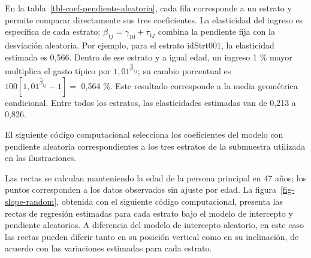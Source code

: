 \documentclass[
  spanish,
  11pt,
  letterpaper,
  oneside,
  open=any]{scrbook}
\newenvironment{Shaded}{\begin{snugshade}}{\end{snugshade}}
\newcommand{\AttributeTok}[1]{\textcolor[rgb]{0.40,0.45,0.13}{#1}}
\newcommand{\FunctionTok}[1]{\textcolor[rgb]{0.28,0.35,0.67}{#1}}
\newcommand{\NormalTok}[1]{\textcolor[rgb]{0.00,0.23,0.31}{#1}}
\newcommand{\OtherTok}[1]{\textcolor[rgb]{0.00,0.23,0.31}{#1}}
\newcommand{\SpecialCharTok}[1]{\textcolor[rgb]{0.37,0.37,0.37}{#1}}
\newcommand{\StringTok}[1]{\textcolor[rgb]{0.13,0.47,0.30}{#1}}
\begin{document}
En la tabla~\ref{tbl-coef-pendiente-aleatoria}, cada fila corresponde a
un estrato y permite comparar directamente sus tres coeficientes. La
elasticidad del ingreso es específica de cada estrato:
\(\beta_{1j}=\gamma_{10}+\tau_{1j}\) combina la pendiente fija con la
desviación aleatoria. Por ejemplo, para el estrato idStrt001, la
elasticidad estimada es 0,566. Dentro de ese estrato y a igual edad, un
ingreso 1 \% mayor multiplica el gasto típico por
\(1{,}01^{\hat\beta_{1j}}\); su cambio porcentual es
\(100[1{,}01^{\hat\beta_{1j}}-1]=\) 0,564 \%. Este resultado corresponde
a la media geométrica condicional. Entre todos los estratos, las
elasticidades estimadas van de 0,213 a 0,826.

El siguiente código computacional selecciona los coeficientes del modelo
con pendiente aleatoria correspondientes a los tres estratos de la
submuestra utilizada en las ilustraciones.

\begin{Shaded}
\end{Shaded}

Las rectas se calculan manteniendo la edad de la persona principal en 47
años; los puntos corresponden a los datos observados sin ajuste por
edad. La figura~\ref{fig-slope-random}, obtenida con el siguiente código
computacional, presenta las rectas de regresión estimadas para cada
estrato bajo el modelo de intercepto y pendiente aleatorios. A
diferencia del modelo de intercepto aleatorio, en este caso las rectas
pueden diferir tanto en su posición vertical como en su inclinación, de
acuerdo con las variaciones estimadas para cada estrato.
\end{document}
